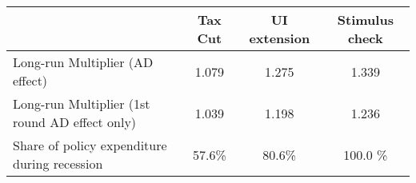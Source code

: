 \begin{tabular}{@{}lccc@{}}
\toprule
& Tax Cut    & UI extension    & Stimulus check    \\  \midrule
Long-run Multiplier (AD effect) &1.079  & 1.275  & 1.339     \\
Long-run Multiplier (1st round AD effect only) &1.039  & 1.198  & 1.236     \\
Share of policy expenditure during recession &57.6\%  & 80.6\%  & 100.0 \%    \\
\end{tabular}
